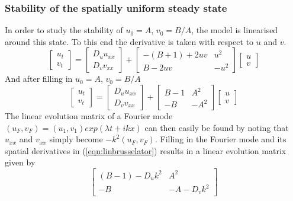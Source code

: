 \subsubsection{Stability of the spatially uniform steady state}
In order to study the stability of $u_0=A$, $v_0=B/A$, the model is linearised around this state.  To this end the derivative is taken with respect to $u$ and $v$.
\begin{equation}\label{eqn:linbrusselator}
\begin{bmatrix}u_t \\ v_t \end{bmatrix}=\begin{bmatrix}D_uu_{xx}\\ D_vv_{xx}\end{bmatrix}+\begin{bmatrix}-(B+1)+2uv & u^2 \\
B-2uv & -u^2 \end{bmatrix}\begin{bmatrix}u\\v\end{bmatrix}
\end{equation}
And after filling in $u_0=A$, $v_0=B/A$
\begin{equation}
\begin{bmatrix}u_t \\ v_t \end{bmatrix}=\begin{bmatrix}D_uu_{xx}\\ D_vv_{xx}\end{bmatrix}+\begin{bmatrix}B-1 & A^2 \\
-B & -A^2 \end{bmatrix}\begin{bmatrix}u\\v\end{bmatrix}
\end{equation}
\newline
\newline
The linear evolution matrix of a Fourier mode $(u_F,v_F) = (u_1,v_1)exp(\lambda t + ikx)$ can then easily be found by noting that $u_{xx}$ and $v_{xx}$ simply become $-k^2(u_F,v_F)$. Filling in the Fourier mode and its spatial derivatives in (\ref{eqn:linbrusselator}) results in a linear evolution matrix given by
\begin{equation}\label{eqn:linevmat}
\begin{bmatrix}(B-1)-D_uk^2 & A^2 \\ -B & -A-D_vk^2\end{bmatrix}
\end{equation}
